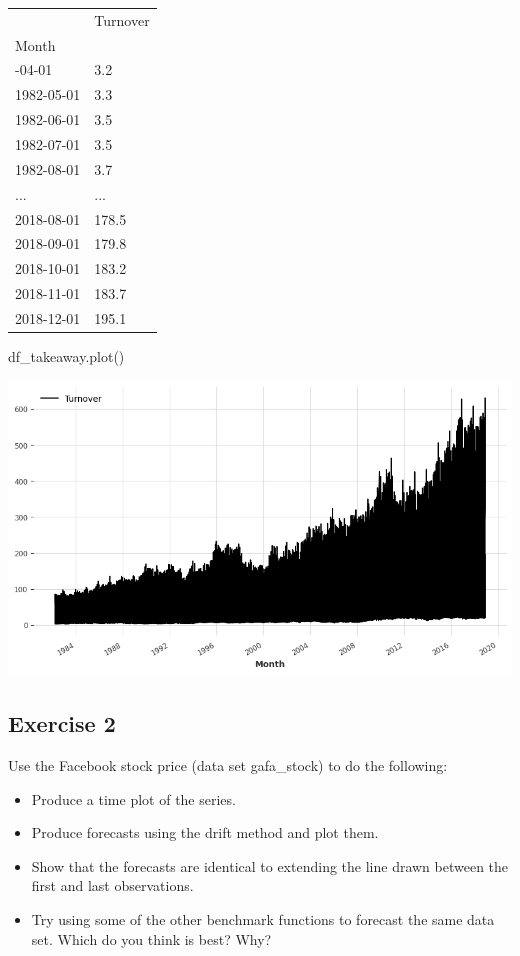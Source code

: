 \documentclass[
  11pt,
]{article}
\newenvironment{Shaded}{\begin{snugshade}}{\end{snugshade}}
\newcommand{\NormalTok}[1]{\textcolor[rgb]{0.00,0.23,0.31}{#1}}
\begin{document}
\begin{longtable}[]{@{}ll@{}}
\toprule\noalign{}
& Turnover \\
Month & \\
\midrule\noalign{}
\endhead
\bottomrule\noalign{}
\endlastfoot
1982-04-01 & 3.2 \\
1982-05-01 & 3.3 \\
1982-06-01 & 3.5 \\
1982-07-01 & 3.5 \\
1982-08-01 & 3.7 \\
... & ... \\
2018-08-01 & 178.5 \\
2018-09-01 & 179.8 \\
2018-10-01 & 183.2 \\
2018-11-01 & 183.7 \\
2018-12-01 & 195.1 \\
\end{longtable}

\begin{Shaded}
\begin{Highlighting}[]
\NormalTok{df\_takeaway.plot()}
\end{Highlighting}
\end{Shaded}

\includegraphics{hw3_files/figure-pdf/cell-26-output-1.png}

\subsection{Exercise 2}\label{exercise-2}

Use the Facebook stock price (data set gafa\_stock) to do the following:

\begin{itemize}
\item
  Produce a time plot of the series.
\item
  Produce forecasts using the drift method and plot them.
\item
  Show that the forecasts are identical to extending the line drawn
  between the first and last observations.
\item
  Try using some of the other benchmark functions to forecast the same
  data set. Which do you think is best? Why?
\end{itemize}
\end{document}
